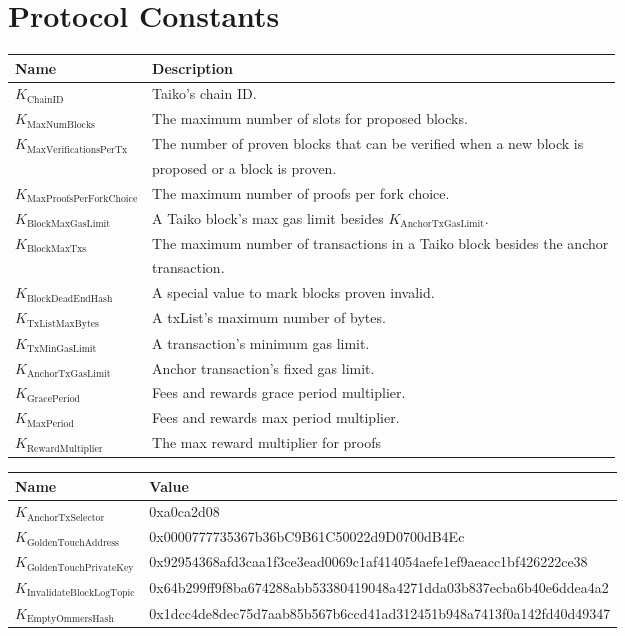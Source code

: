 \documentclass[9pt,oneside]{amsart}
\begin{document}
\section{Protocol Constants}\label{sec:constants1}

\begin{tabu}{l l}
\toprule
Name  & Description \\
\midrule
$K_{\mathrm{ChainID}}$ & Taiko's chain ID. \\
$K_{\mathrm{MaxNumBlocks}}$ & The maximum number of slots for proposed blocks. \\
$K_{\mathrm{MaxVerificationsPerTx}}$  & The number of proven blocks that can be verified when a new block is\\
& proposed or a block is proven. \\
$K_{\mathrm{MaxProofsPerForkChoice}}$ & The maximum number of proofs per fork choice. \\
$K_{\mathrm{BlockMaxGasLimit}}$  & A Taiko block's max gas limit besides $K_{\mathrm{AnchorTxGasLimit}}$.  \\
$K_{\mathrm{BlockMaxTxs}}$  & The maximum number of transactions in a Taiko block besides the anchor\\
&  transaction. \\
$K_{\mathrm{BlockDeadEndHash}}$ & A special value to mark blocks proven invalid. \\
$K_{\mathrm{TxListMaxBytes}}$  & A txList's maximum number of bytes. \\
$K_{\mathrm{TxMinGasLimit}}$  & A transaction's minimum gas limit. \\
$K_{\mathrm{AnchorTxGasLimit}}$  & Anchor transaction's fixed gas limit. \\
$K_{\mathrm{GracePeriod}}$  & Fees and rewards grace period multiplier. \\
$K_{\mathrm{MaxPeriod}}$ & Fees and rewards max period multiplier. \\
$K_{\mathrm{RewardMultiplier}}$ & The max reward multiplier for proofs \\
\bottomrule
\end{tabu}

\begin{tabu}{l l}
\toprule
Name &  \quad \quad Value \\
\midrule
$K_{\mathrm{AnchorTxSelector}}$ &  \quad \quad 0xa0ca2d08 \\
$K_{\mathrm{GoldenTouchAddress}}$ &  \quad \quad 0x0000777735367b36bC9B61C50022d9D0700dB4Ec  \\
$K_{\mathrm{GoldenTouchPrivateKey}}$ & \quad \quad 0x92954368afd3caa1f3ce3ead0069c1af414054aefe1ef9aeacc1bf426222ce38 \\
$K_{\mathrm{InvalidateBlockLogTopic}}$ & \quad \quad 0x64b299ff9f8ba674288abb53380419048a4271dda03b837ecba6b40e6ddea4a2 \\
$K_{\mathrm{EmptyOmmersHash}}$ & \quad \quad 0x1dcc4de8dec75d7aab85b567b6ccd41ad312451b948a7413f0a142fd40d49347   \quad \quad \quad \quad \\
\bottomrule
\end{tabu}
\end{document}

